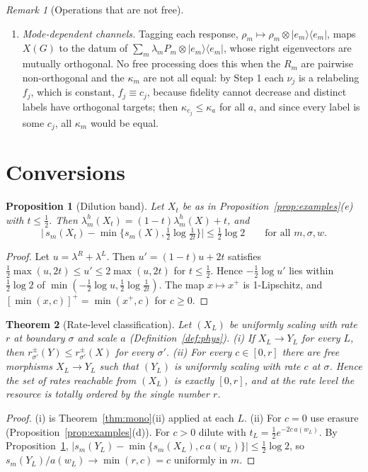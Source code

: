 \documentclass[11pt]{article}
\newtheorem{theorem}{Theorem}
\newtheorem{proposition}[theorem]{Proposition}
\theoremstyle{definition}
\theoremstyle{remark}
\newtheorem{remark}{Remark}
\newcommand{\proj}[1]{|#1\rangle\!\langle #1|}
\begin{document}
\begin{remark}[Operations that are not free]
\begin{enumerate}
\item[(c)] \emph{Mode-dependent channels.} Tagging each response, $\rho_m\mapsto\rho_m\otimes\proj{e_m}$, maps $X(G)$ to the datum of $\sum_m\lambda_mP_m\otimes\proj{e_m}$, whose right eigenvectors are mutually orthogonal. No free processing does this when the $R_m$ are pairwise non-orthogonal and the $\kappa_m$ are not all equal: by Step 1 each $\nu_j$ is a relabeling $f_j$, which is constant, $f_j\equiv c_j$, because fidelity cannot decrease and distinct labels have orthogonal targets; then $\kappa_{c_j}\le\kappa_a$ for all $a$, and since every label is some $c_j$, all $\kappa_m$ would be equal.
\end{enumerate}
\end{remark}

\section{Conversions}
\label{sec:conv}

\begin{proposition}[Dilution band]\label{prop:dil}
Let $X_t$ be as in Proposition~\ref{prop:examples}(e) with $t\le\frac12$. Then $\lambda^h_m(X_t)=(1-t)\lambda^h_m(X)+t$, and
\[
\bigl|\,s_m(X_t)-\min\{s_m(X),\tfrac12\log\tfrac1{2t}\}\bigr|\le\tfrac12\log2\qquad\text{for all }m,\sigma,w.
\]
\end{proposition}
\begin{proof}
Let $u=\lambda^R+\lambda^L$. Then $u'=(1-t)u+2t$ satisfies $\frac12\max(u,2t)\le u'\le2\max(u,2t)$ for $t\le\frac12$. Hence $-\frac12\log u'$ lies within $\frac12\log2$ of $\min(-\frac12\log u,\frac12\log\frac1{2t})$. The map $x\mapsto x^+$ is 1-Lipschitz, and $[\min(x,c)]^+=\min(x^+,c)$ for $c\ge0$.
\end{proof}

\begin{theorem}[Rate-level classification]\label{thm:rate}
Let $(X_L)$ be uniformly scaling with rate $r$ at boundary $\sigma$ and scale $a$ (Definition~\ref{def:phys}).
(i) If $X_L\to Y_L$ for every $L$, then $r^\pm_{\sigma'}(Y)\le r^\pm_{\sigma'}(X)$ for every $\sigma'$.
(ii) For every $c\in[0,r]$ there are free morphisms $X_L\to Y_L$ such that $(Y_L)$ is uniformly scaling with rate $c$ at $\sigma$.
Hence the set of rates reachable from $(X_L)$ is exactly $[0,r]$, and at the rate level the resource is totally ordered by the single number $r$.
\end{theorem}
\begin{proof}
(i) is Theorem~\ref{thm:mono}(ii) applied at each $L$. (ii) For $c=0$ use erasure (Proposition~\ref{prop:examples}(d)). For $c>0$ dilute with $t_L=\frac12e^{-2c\,a(w_L)}$. By Proposition~\ref{prop:dil}, $|s_m(Y_L)-\min\{s_m(X_L),c\,a(w_L)\}|\le\frac12\log2$, so $s_m(Y_L)/a(w_L)\to\min(r,c)=c$ uniformly in $m$.
\end{proof}
\end{document}
